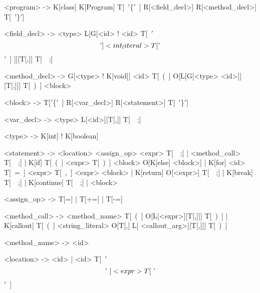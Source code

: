 \begin{bnfgrammar}
<program> -> K[class] K[Program] T[~$'$\{$'$~] R[<field_decl>] R[<method_decl>] T[~$'$\}$'$]

<field_decl> -> <type> L[G[<id> ! <id> T[~$'$\[$'$] <int_literal> T[$'$\]$'$~] ]][T[,]] T[~~;]

<method_decl> -> G[<type> ! K[void]] <id> T[~(~] O[L[G[<type> <id>]][T[,]]] T[~)~] <block>

<block> -> T[$'$\{$'$~] R[<var_decl>]  R[<statement>] T[~$'$\}$'$]

<var_decl> -> <type> L[<id>][T[,]] T[~~;]

<type> -> K[int] ! K[boolean]

<statement> -> <location> <assign_op> <expr> T[~~;]
             | <method_call> T[~~;]
             | K[if] T[~(~] <expr> T[~)~] <block> O[K[else] <block>]
             | K[for] <id> T[~=~] <expr> T[~,~] <expr> <block>
             | K[return] O[<expr>] T[~~;]
             | K[break] T[~~;]
             | K[continue] T[~~;]
             | <block>

<assign_op> -> T[=]
             | T[+=]
	     | T[-=]	

<method_call> -> <method_name> T[~(~] O[L[<expr>][T[,]]] T[~)~]
        | K[callout] T[~(~] <string_literal> O[T[,] L[ <callout_arg>][T[,]]] T[~)~]

<method_name> -> <id>

<location> -> <id>
            | <id> T[~$'$\[$'$~] <expr> T[~$'$\]$'$~]

\end{bnfgrammar}

